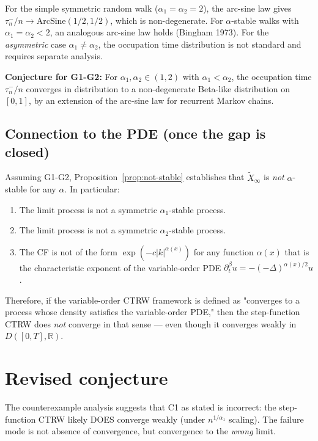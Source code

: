 \documentclass{amsart}
\theoremstyle{definition}
\begin{document}
For the simple symmetric random walk ($\alpha_1 = \alpha_2 = 2$), the
arc-sine law gives $\tau_n^-/n \to \text{ArcSine}(1/2, 1/2)$, which is
non-degenerate. For $\alpha$-stable walks with $\alpha_1 = \alpha_2 < 2$,
an analogous arc-sine law holds (Bingham 1973). For the \emph{asymmetric}
case $\alpha_1 \neq \alpha_2$, the occupation time distribution is not
standard and requires separate analysis.

\textbf{Conjecture for G1-G2:} For $\alpha_1, \alpha_2 \in (1,2)$ with $\alpha_1 < \alpha_2$,
the occupation time $\tau_n^-/n$ converges in distribution to a non-degenerate
Beta-like distribution on $[0,1]$, by an extension of the arc-sine law for
recurrent Markov chains.

\subsection{Connection to the PDE (once the gap is closed)}

Assuming G1-G2, Proposition~\ref{prop:not-stable} establishes that $\tilde{X}_\infty$
is \emph{not} $\alpha$-stable for any $\alpha$. In particular:

\begin{enumerate}
    \item The limit process is not a symmetric $\alpha_1$-stable process.
    \item The limit process is not a symmetric $\alpha_2$-stable process.
    \item The CF is not of the form $\exp(-c|k|^{\alpha(x)})$ for any function $\alpha(x)$
          that is the characteristic exponent of the variable-order PDE
          $\partial_t^\beta u = -(-\Delta)^{\alpha(x)/2} u$.
\end{enumerate}

Therefore, if the variable-order CTRW framework is defined as "converges to a process
whose density satisfies the variable-order PDE," then the step-function CTRW does
\emph{not} converge in that sense --- even though it converges weakly in
$D([0,T], \mathbb{R})$.

\section{Revised conjecture}
\label{sec:revised}

The counterexample analysis suggests that C1 as stated is incorrect: the step-function
CTRW likely DOES converge weakly (under $n^{1/\alpha_1}$ scaling). The failure mode is
not absence of convergence, but convergence to the \emph{wrong} limit.
\end{document}
